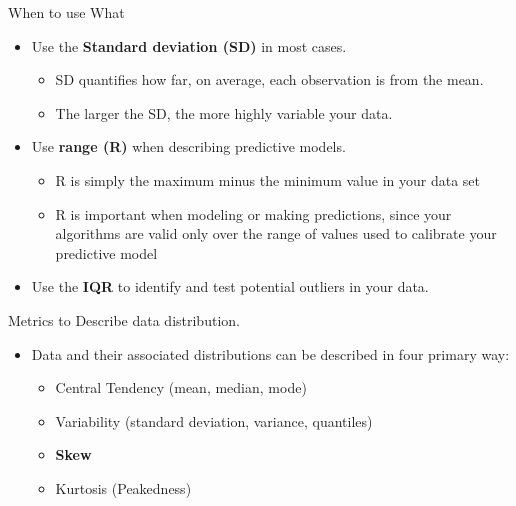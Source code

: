 \documentclass[
  ignorenonframetext,
]{beamer}
\providecommand{\tightlist}{%
  \setlength{\itemsep}{0pt}\setlength{\parskip}{0pt}}
\begin{document}
\begin{frame}{When to use What}
\label{when-to-use-what-1}
\begin{itemize}
\tightlist
\item
  Use the \textbf{Standard deviation (SD)} in most cases.

  \begin{itemize}
  \tightlist
  \item
    SD quantifies how far, on average, each observation is from the
    mean.
  \item
    The larger the SD, the more highly variable your data.
  \end{itemize}
\end{itemize}

\begin{itemize}
\tightlist
\item
  Use \textbf{range (R)} when describing predictive models.

  \begin{itemize}
  \tightlist
  \item
    R is simply the maximum minus the minimum value in your data set
  \item
    R is important when modeling or making predictions, since your
    algorithms are valid only over the range of values used to calibrate
    your predictive model
  \end{itemize}
\end{itemize}

\begin{itemize}
\tightlist
\item
  Use the \textbf{IQR} to identify and test potential outliers in your
  data.
\end{itemize}
\end{frame}

\begin{frame}{Metrics to Describe data distribution.}
\label{metrics-to-describe-data-distribution.-3}
\begin{itemize}
\item
  Data and their associated distributions can be described in four
  primary way:

  \begin{itemize}
  \tightlist
  \item
    Central Tendency (mean, median, mode)
  \item
    Variability (standard deviation, variance, quantiles)
  \item
    \textbf{Skew}
  \item
    Kurtosis (Peakedness)
  \end{itemize}
\end{itemize}
\end{frame}
\end{document}
